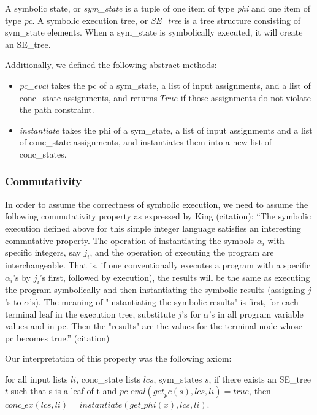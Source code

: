 A symbolic state, or \textit{sym\_state} is a tuple of one item of type \textit{phi} and one item of type \textit{pc}.
A symbolic execution tree, or \textit{SE\_tree} is a tree structure consisting of sym\_state elements. 
When a sym\_state is symbolically executed, it will create an SE\_tree.

Additionally, we defined the following abstract methods:
\begin{itemize}
\item \textit{pc\_eval} takes the pc of a sym\_state, a list of input assignments, and a list of conc\_state assignments, and returns $True$ if those assignments do not violate the path constraint.
\item \textit{instantiate} takes the phi of a sym\_state, a list of input assignments and a list of conc\_state assignments, and instantiates them into a new list of conc\_states.
\end{itemize}


\subsubsection{Commutativity}
In order to assume the correctness of symbolic execution, we need to assume the following commutativity property as expressed by King (citation):
``The symbolic execution defined above for this simple
integer language satisfies an interesting commutative
property. The operation of instantiating the symbols
{$\alpha_i$} with specific integers, say {$j_i$}, and the operation of
executing the program are interchangeable. That is, if
one conventionally executes a program with a specific
$\alpha_i$'s by
$j_i$'s first, followed by execution), the results will be the
same as executing the program symbolically and then
instantiating the symbolic results (assigning $j$'s to $\alpha$'s).
The meaning of "instantiating the symbolic results" is
first, for each terminal leaf in the execution tree, substitute
$j$'s for $\alpha$'s in all program variable values and in
pc. Then the "results" are the values for the terminal 
node whose pc becomes true.'' (citation)


Our interpretation of this property was the following axiom:
\begin{axiom}
for all input lists $li$, conc\_state lists $lcs$, sym\_states $s$,
if there exists an SE\_tree $t$ such that
s is a leaf of t and
$pc\_eval (get_pc(s), lcs, li) = true$,
then
$conc\_ex(lcs, li) = instantiate (get\_phi (x), lcs, li)$.
\end{axiom}

